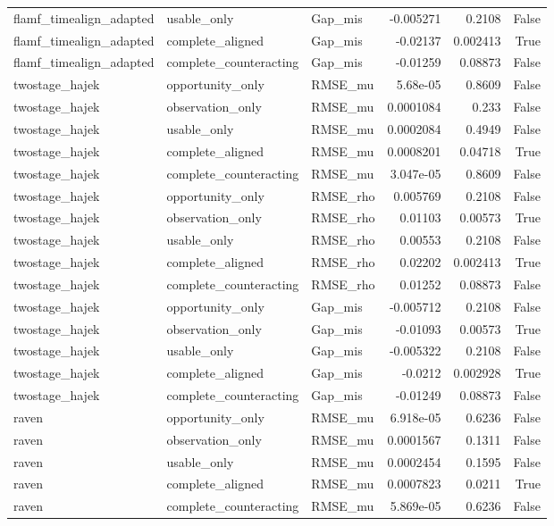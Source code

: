 \begin{table}
\begin{tabular}{lllrrr}
flamf_timealign_adapted & usable_only & Gap_mis & -0.005271 & 0.2108 & False \\
flamf_timealign_adapted & complete_aligned & Gap_mis & -0.02137 & 0.002413 & True \\
flamf_timealign_adapted & complete_counteracting & Gap_mis & -0.01259 & 0.08873 & False \\
twostage_hajek & opportunity_only & RMSE_mu & 5.68e-05 & 0.8609 & False \\
twostage_hajek & observation_only & RMSE_mu & 0.0001084 & 0.233 & False \\
twostage_hajek & usable_only & RMSE_mu & 0.0002084 & 0.4949 & False \\
twostage_hajek & complete_aligned & RMSE_mu & 0.0008201 & 0.04718 & True \\
twostage_hajek & complete_counteracting & RMSE_mu & 3.047e-05 & 0.8609 & False \\
twostage_hajek & opportunity_only & RMSE_rho & 0.005769 & 0.2108 & False \\
twostage_hajek & observation_only & RMSE_rho & 0.01103 & 0.00573 & True \\
twostage_hajek & usable_only & RMSE_rho & 0.00553 & 0.2108 & False \\
twostage_hajek & complete_aligned & RMSE_rho & 0.02202 & 0.002413 & True \\
twostage_hajek & complete_counteracting & RMSE_rho & 0.01252 & 0.08873 & False \\
twostage_hajek & opportunity_only & Gap_mis & -0.005712 & 0.2108 & False \\
twostage_hajek & observation_only & Gap_mis & -0.01093 & 0.00573 & True \\
twostage_hajek & usable_only & Gap_mis & -0.005322 & 0.2108 & False \\
twostage_hajek & complete_aligned & Gap_mis & -0.0212 & 0.002928 & True \\
twostage_hajek & complete_counteracting & Gap_mis & -0.01249 & 0.08873 & False \\
raven & opportunity_only & RMSE_mu & 6.918e-05 & 0.6236 & False \\
raven & observation_only & RMSE_mu & 0.0001567 & 0.1311 & False \\
raven & usable_only & RMSE_mu & 0.0002454 & 0.1595 & False \\
raven & complete_aligned & RMSE_mu & 0.0007823 & 0.0211 & True \\
raven & complete_counteracting & RMSE_mu & 5.869e-05 & 0.6236 & False \\

\end{tabular}
\end{table}
